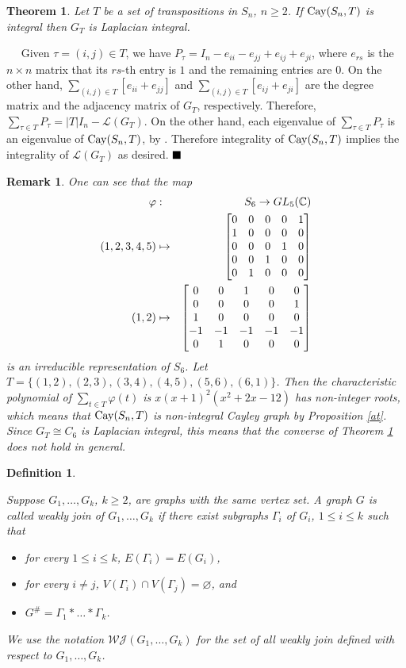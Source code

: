 \documentclass[12pt,a4paper]{article}
\newtheorem{theorem}{\bf Theorem}%
\newtheorem{remark}{\bf Remark}
\newtheorem{defin}{\bf Definition}
\renewcommand{\proof}{\noindent{\it\textbf{Proof.}}\ \ }
\newcommand{\Cay}{{\rm Cay}}
\newcommand{\eqd}{$\hfill \blacksquare$}
\begin{document}
\begin{theorem}\label{main}
Let $T$ be a set of transpositions in $S_n$, $n\geq 2$. If $\Cay(S_n,T)$ is integral then $G_T$ is Laplacian integral.
\end{theorem}
\proof
Given $\tau=(i,j)\in T$, we have $P_\tau=I_n-e_{ii}-e_{jj}+e_{ij}+e_{ji}$, where $e_{rs}$ is the $n\times n$ matrix that its $rs$-th entry is $1$ and the remaining entries are $0$. On the other hand, $\sum_{(i,j)\in T}[e_{ii}+e_{jj}]$ and $\sum_{(i,j)\in T}[e_{ij}+e_{ji}]$ are the degree matrix and the adjacency matrix of $G_T$, respectively. Therefore,
$\sum_{\tau\in T}P_\tau=|T|I_n-\mathcal{L}(G_T)$. On the other hand, each eigenvalue of $\sum_{\tau\in T}P_\tau$ is an eigenvalue of $\Cay(S_n,T)$, by \cite[Proposition 2.1]{DF}. Therefore integrality of $\Cay(S_n,T)$ implies the integrality of
$\mathcal{L}(G_T)$ as desired.
\eqd
\begin{remark}\label{rmk} One can see that the map
\begin{eqnarray*}
\varphi&:&S_6\rightarrow GL_5(\Bbb C)\\
(1,2,3,4,5)&\mapsto & \begin{bmatrix}
 0& 0& 0& 0& 1\\
 1& 0& 0& 0& 0\\
 0& 0& 0& 1& 0\\
 0& 0& 1& 0& 0\\
 0& 1& 0& 0& 0
\end{bmatrix} \\
(1,2)&\mapsto & \begin{bmatrix}
0& 0& 1& 0& 0\\
0& 0& 0& 0& 1\\
1&0& 0& 0& 0\\
-1& -1& -1& -1& -1\\ 
0& 1& 0& 0& 0 
\end{bmatrix}
\end{eqnarray*}
is an irreducible representation of $S_6$. Let $T=\{(1,2),(2,3),(3,4),(4,5),(5,6),(6,1)\}$. Then the characteristic polynomial
of $\sum_{t\in T}\varphi(t)$ is $x(x+1)^2(x^2+2x-12)$ has non-integer roots, which means that $\Cay(S_n,T)$ is  non-integral Cayley graph by Proposition \ref{at}. Since $G_T\cong C_6$ is Laplacian integral, this means that the converse of 
Theorem \ref{main} does not hold in general.
\end{remark}

\begin{defin} \label{defin0} {\rm Suppose $G_1,\dots,G_k$, $k\geq 2$,  are  graphs with the same vertex set. A graph $G$ is called \textit{weakly join of $G_1,\dots,G_k$} if there exist subgraphs $\Gamma_i$ of $G_i$, $1\leq i\leq k$ such that 
\begin{itemize}
\item[(1)] for every $1\leq i\leq k$, $E(\Gamma_i)=E(G_i)$,
\item[(2)] for every $i\neq j$, $V(\Gamma_i)\cap V(\Gamma_j)=\varnothing$, and
\item[(3)] $G^\#=\Gamma_1*\dots*\Gamma_k$.
\end{itemize}
We use the notation $\mathcal{WJ}(G_1,\dots,G_k)$ for the set of all weakly join defined with respect to $G_1,\dots,G_k$.}
\end{defin}
\end{document}
